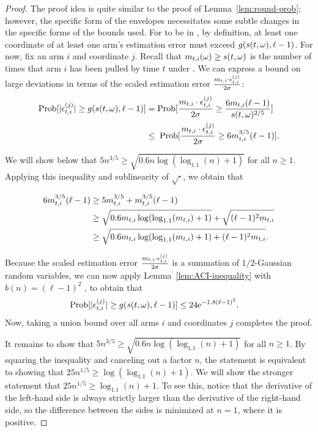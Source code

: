 \begin{proof}
The proof idea is quite similar to the proof of
Lemma~\ref{lem:round-prob};
however, the specific form of the envelopes necessitates some subtle
changes in the specific forms of the bounds used.
For \SP to be in \Env[t]{\ell}, by definition, at least one coordinate
of at least one arm's estimation error must exceed $g(s(t,\omega),\ell-1)$.
For now, fix an arm $i$ and coordinate $j$.
Recall that $m_{t,i}(\omega) \geq s(t,\omega)$ is the number of times
that arm $i$ has been pulled by time $t$ under \SP.
We can express a bound on large deviations in terms of
the scaled estimation error
$\frac{m_{t,i} \cdot \epsilon_{t,i}^{(j)}}{2\sigma}$:
\begin{align*}
\Prob{|\Err{t}{i}{j}| \geq g(s(t,\SP), \ell-1)}
& = \Prob{\frac{\NumPull{t}{i} \cdot \Err{t}{i}{j}}{2\sigma}
          \geq \frac{6\NumPull{t}{i}(\ell-1)}{s(t,\SP)^{2/5}}}\\
& \leq \; \Prob{\frac{\NumPull{t}{i} \cdot \Err{t}{i}{j}}{2\sigma}
          \geq 6\NumPull{t}{i}^{3/5}(\ell-1)}. 
\end{align*}

We will show below that
$5 n^{3/5} \geq \sqrt{0.6n \log(\log_{1.1}(n)+1)}$
for all $n \geq 1$.
Applying this inequality and sublinearity of $\sqrt{\cdot}$,
we obtain that

\begin{align*}
6 m_{t,i}^{3/5}(\ell-1)
& \geq 5 m_{t,i}^{3/5} + m_{t,i}^{3/5}(\ell-1)  \\
& \geq \sqrt{0.6 m_{t,i} \log(\log_{1.1}(m_{t,i})+1)}
     + \sqrt{(\ell-1)^2 m_{t,i}}  \\
& \geq \sqrt{0.6m_{t,i}\log(\log_{1.1}(m_{t,i})+1)+(\ell-1)^2 m_{t,i}}. 
\end{align*}

Because the scaled estimation error
$\frac{m_{t,i} \cdot \epsilon_{t,i}^{(j)}}{2\sigma}$
is a summation of $1/2$-Gaussian random variables, 
we can now apply Lemma~\ref{lem:ACI-inequality}
with $b(n) = (\ell-1)^2$ ,
to obtain that
\begin{align*}
\Prob{|\Err{t}{i}{j}| \geq g(s(t,\SP), \ell-1)}
& \leq 24 \e^{-1.8(\ell-1)^2}.
\end{align*}
Now, taking a union bound over all arms $i$ and
coordinates $j$ completes the proof.

It remains to show that
$5 n^{3/5} \geq \sqrt{0.6n \log(\log_{1.1}(n)+1)}$
for all $n \geq 1$.
By squaring the inequality and canceling out a factor $n$,
the statement is equivalent to showing that
$25 n^{1/5} \geq \log(\log_{1.1}(n)+1)$.
We will show the stronger statement that
$25 n^{1/5} \geq \log_{1.1}(n)+1$.  
To see this, notice that the derivative of the left-hand side is
always strictly larger than the derivative of the right-hand side,
so the difference between the sides is minimized at $n=1$,
where it is positive. 
\end{proof}

